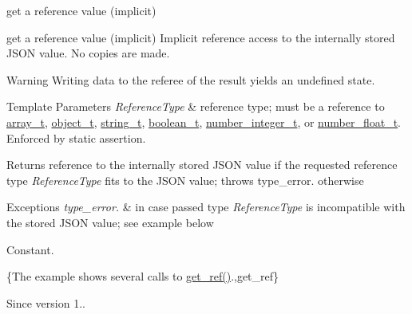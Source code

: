 get a reference value (implicit) 

get a reference value (implicit) Implicit reference access to the internally stored J\+S\+ON value. No copies are made.

\begin{DoxyWarning}{Warning}
Writing data to the referee of the result yields an undefined state.
\end{DoxyWarning}

\begin{DoxyTemplParams}{Template Parameters}
{\em Reference\+Type} & reference type; must be a reference to \hyperlink{classnlohmann_1_1basic__json_a53700c308d804f84aea5ff05abb2ac4e}{array\+\_\+t}, \hyperlink{classnlohmann_1_1basic__json_a5e3df077f880583a96d74cd63e173cb2}{object\+\_\+t}, \hyperlink{classnlohmann_1_1basic__json_a33593865ffb1860323dcbd52425b90c8}{string\+\_\+t}, \hyperlink{classnlohmann_1_1basic__json_a44fd1a12c9c54623c942b430e7a72937}{boolean\+\_\+t}, \hyperlink{classnlohmann_1_1basic__json_a11e390944da90db83089eb2426a749d3}{number\+\_\+integer\+\_\+t}, or \hyperlink{classnlohmann_1_1basic__json_a5b8abaebd922d82d69756327c0c347e6}{number\+\_\+float\+\_\+t}. Enforced by static assertion.\\
\hline
\end{DoxyTemplParams}
\begin{DoxyReturn}{Returns}
reference to the internally stored J\+S\+ON value if the requested reference type {\itshape Reference\+Type} fits to the J\+S\+ON value; throws type\+\_\+error. otherwise
\end{DoxyReturn}

\begin{DoxyExceptions}{Exceptions}
{\em type\+\_\+error.} & in case passed type {\itshape Reference\+Type} is incompatible with the stored J\+S\+ON value; see example below\\
\hline
\end{DoxyExceptions}
Constant.

\{The example shows several calls to {\ttfamily \hyperlink{classnlohmann_1_1basic__json_a14ddc6e0f6d70296bc81f810254076c5}{get\+\_\+ref()}}.,get\+\_\+ref\}

\begin{DoxySince}{Since}
version 1.. 
\end{DoxySince}
